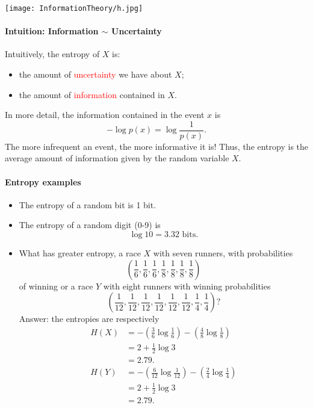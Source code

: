 \documentclass[a4paper, 11pt, openany]{book}
\numberwithin{equation}{section}
\theoremstyle{plain}
\theoremstyle{definition}
\newcommand{\Important}[1]{\textcolor{red}{#1}}
\begin{document}
\begin{center}
\texttt{[image: InformationTheory/h.jpg]}
\end{center}


\paragraph{Intuition: Information $\sim$ Uncertainty}

Intuitively, the entropy of $X$ is:
\begin{itemize}
	\item the amount of \Important{uncertainty} we have about $X$;

	\item the amount of \Important{information} contained in $X$.	
\end{itemize}
In more detail, the information contained in the event $x$ is
\[
	-\log p(x) = \log \frac{1}{p(x)}.
\]
The more infrequent an event, the more informative it is! Thus, the entropy is the average amount of information given by the random variable $X$.





\paragraph{Entropy examples}
\begin{itemize}
\item The entropy of a random bit is 1 bit.

\item The entropy of a random digit (0-9) is
\[
    \log 10 = 3.32 \text{ bits.}
\]

\item What has greater entropy, a race $X$ with seven runners, with probabilities
\[
    \left( \frac{1}{6}, \frac{1}{6}, \frac{1}{6}, \frac{1}{8}, \frac{1}{8}, \frac{1}{8}, \frac{1}{8} \right)
\]
 of winning or a race $Y$ with eight runners with winning probabilities
\[
    \left( \frac{1}{12}, \frac{1}{12}, \frac{1}{12}, \frac{1}{12}, \frac{1}{12}, \frac{1}{12}, \frac{1}{4}, \frac{1}{4} \right)?
\]
Answer: the entropies are respectively
\begin{align*}
    H(X) &= - \left( \frac{3}{6} \log \frac{1}{6} \right) - \left( \frac{4}{8} \log \frac{1}{8} \right) \\
    &= 2 + \frac{1}{2} \log 3 \\
    & = 2.79.\\
    H(Y) &= - \left( \frac{6}{12} \log \frac{1}{12} \right) - \left( \frac{2}{4} \log \frac{1}{4} \right) \\
    &= 2 + \frac{1}{2} \log 3\\
    &= 2.79.
\end{align*}
\end{itemize}
\end{document}
